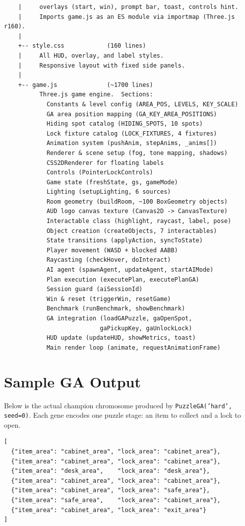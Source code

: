 \documentclass[12pt, a4paper]{report}
\begin{document}
\begin{verbatim}
    |     overlays (start, win), prompt bar, toast, controls hint.
    |     Imports game.js as an ES module via importmap (Three.js r160).
    |
    +-- style.css            (160 lines)
    |     All HUD, overlay, and label styles.
    |     Responsive layout with fixed side panels.
    |
    +-- game.js              (~1700 lines)
          Three.js game engine.  Sections:
            Constants & level config (AREA_POS, LEVELS, KEY_SCALE)
            GA area position mapping (GA_KEY_AREA_POSITIONS)
            Hiding spot catalog (HIDING_SPOTS, 10 spots)
            Lock fixture catalog (LOCK_FIXTURES, 4 fixtures)
            Animation system (pushAnim, stepAnims, _anims[])
            Renderer & scene setup (fog, tone mapping, shadows)
            CSS2DRenderer for floating labels
            Controls (PointerLockControls)
            Game state (freshState, gs, gameMode)
            Lighting (setupLighting, 6 sources)
            Room geometry (buildRoom, ~100 BoxGeometry objects)
            AUD logo canvas texture (Canvas2D -> CanvasTexture)
            Interactable class (highlight, raycast, label, pose)
            Object creation (createObjects, 7 interactables)
            State transitions (applyAction, syncToState)
            Player movement (WASD + blocked AABB)
            Raycasting (checkHover, doInteract)
            AI agent (spawnAgent, updateAgent, startAIMode)
            Plan execution (executePlan, executePlanGA)
            Session guard (aiSessionId)
            Win & reset (triggerWin, resetGame)
            Benchmark (runBenchmark, showBenchmark)
            GA integration (loadGAPuzzle, gaOpenSpot,
                           gaPickupKey, gaUnlockLock)
            HUD update (updateHUD, showMetrics, toast)
            Main render loop (animate, requestAnimationFrame)
\end{verbatim}

\chapter{Sample GA Output}
\label{app:gasample}

Below is the actual champion chromosome produced by \texttt{PuzzleGA('hard', seed=0)}.  Each gene encodes one puzzle stage: an item to collect and a lock to open.

\begin{lstlisting}[style=pyStyle, caption={Champion chromosome (seed=0, 7 stages, fitness 126).}]
[
  {"item_area": "cabinet_area", "lock_area": "cabinet_area"},
  {"item_area": "cabinet_area", "lock_area": "cabinet_area"},
  {"item_area": "desk_area",    "lock_area": "desk_area"},
  {"item_area": "cabinet_area", "lock_area": "cabinet_area"},
  {"item_area": "cabinet_area", "lock_area": "safe_area"},
  {"item_area": "safe_area",    "lock_area": "cabinet_area"},
  {"item_area": "cabinet_area", "lock_area": "exit_area"}
]
\end{lstlisting}
\end{document}
